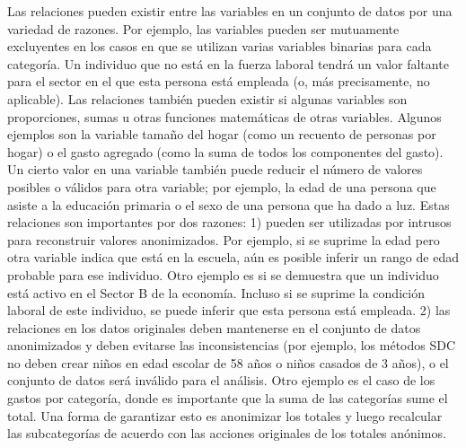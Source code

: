 \documentclass[]{book}
\theoremstyle{definition}
\theoremstyle{definition}
\theoremstyle{definition}
\theoremstyle{definition}
\theoremstyle{remark}
\begin{document}
Las relaciones pueden existir entre las variables en un conjunto de datos por una variedad de razones. Por ejemplo, las variables pueden ser mutuamente excluyentes en los casos en que se utilizan varias variables binarias para cada categoría. Un individuo que no está en la fuerza laboral tendrá un valor faltante para el sector en el que esta persona está empleada (o, más precisamente, no aplicable). Las relaciones también pueden existir si algunas variables son proporciones, sumas u otras funciones matemáticas de otras variables. Algunos ejemplos son la variable tamaño del hogar (como un recuento de personas por hogar) o el gasto agregado (como la suma de todos los componentes del gasto). Un cierto valor en una variable también puede reducir el número de valores posibles o válidos para otra variable; por ejemplo, la edad de una persona que asiste a la educación primaria o el sexo de una persona que ha dado a luz. Estas relaciones son importantes por dos razones: 1) pueden ser utilizadas por intrusos para reconstruir valores anonimizados. Por ejemplo, si se suprime la edad pero otra variable indica que está en la escuela, aún es posible inferir un rango de edad probable para ese individuo. Otro ejemplo es si se demuestra que un individuo está activo en el Sector B de la economía. Incluso si se suprime la condición laboral de este individuo, se puede inferir que esta persona está empleada. 2) las relaciones en los datos originales deben mantenerse en el conjunto de datos anonimizados y deben evitarse las inconsistencias (por ejemplo, los métodos SDC no deben crear niños en edad escolar de 58 años o niños casados de 3 años), o el conjunto de datos será inválido para el análisis. Otro ejemplo es el caso de los gastos por categoría, donde es importante que la suma de las categorías sume el total. Una forma de garantizar esto es anonimizar los totales y luego recalcular las subcategorías de acuerdo con las acciones originales de los totales anónimos.
\end{document}
